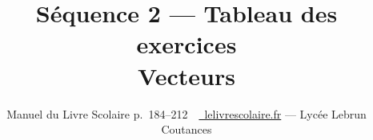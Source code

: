 \documentclass[10pt,a4paper]{article}
\title{\textbf{S\'equence 2 --- Tableau des exercices}\\[4pt]\large Vecteurs}
\author{Manuel du Livre Scolaire p.~184--212~\textbullet~{\color{calcblue}\href{https://www.lelivrescolaire.fr/}{\faIcon{external-link-alt}~\ttfamily\small lelivrescolaire.fr}} --- Lyc\'ee Lebrun Coutances}
\date{}
\newcommand*{\textcircledd}[1]{\begin{tikzpicture}[baseline=(letter.base)]\node[draw,circle,inner sep=1pt] (letter) {#1};\end{tikzpicture}}
\begin{document}
\maketitle
\vspace{6pt}

\newcommand{\starfull}[1]{{\color{#1}\ding{72}}}
\newcommand{\starempty}{{\color{gray!45}\ding{73}}}
\newcommand{\cellA}[1]{\parbox[c][1.9cm][c]{4.3cm}{\raggedright #1}}
\newcommand{\cellB}[1]{\parbox[c][1.9cm][c]{4.3cm}{\raggedright\footnotesize #1}}
\newcommand{\IconManuel}{\textcircledd{\bfseries\scriptsize M}}
\newcommand{\IconFeuilleDeux}{\textcircledd{\bfseries\scriptsize F2}}
\newcommand{\IconFeuilleTrois}{\textcircledd{\bfseries\scriptsize F3}}
\newcommand{\IconFeuilleTroisQ}{\textcircledd{\bfseries\scriptsize F3}\textsuperscript{\bfseries 3/4}}
\newcommand{\headcell}[1]{\parbox[c][0.75cm][c]{4.3cm}{\centering \scalebox{1.6}{#1}}}
\end{document}
